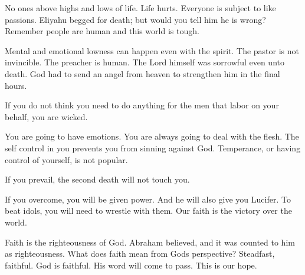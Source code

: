 \documentclass[12pt]{article}
\begin{document}
	No ones above highs and lows of life. Life 
	hurts. Everyone is subject to like passions. Eliyahu begged
	for death; but would you tell him he is wrong? Remember
	people are human and this world is tough.

	Mental and emotional lowness can happen even with the spirit. 
	The pastor is not invincible. The preacher is human. The Lord
	himself was sorrowful even unto death. God had to send an angel
	from heaven to strengthen him in the final hours.

	If you do not think you need to do anything for the men that
	labor on your behalf, you are wicked.

	\begin{quote}
		\BibleHebrewsThirteenTen{}
		\BibleHebrewsThirteenEleven{}
		\BibleHebrewsThirteenTwelve{}
		\BibleHebrewsThirteenThirteen{}
		\BibleHebrewsThirteenFourteen{}
		\BibleHebrewsThirteenFifteen{}
		\BibleHebrewsThirteenSixteen{}
		\BibleHebrewsThirteenSeventeen{}
	\end{quote}
	
	You are going to have emotions. You are always going to deal
	with the flesh. The self control in you prevents you from
	sinning against God. Temperance, or having control of yourself,
	is not popular.

	\begin{quote}
		\BibleRevelationTwoEleven{}
	\end{quote}

	If you prevail, the second death will not touch you.

	\begin{quote}
		\BibleRevelationTwoSeventeen{}
	\end{quote}

	\begin{quote}
		\BibleRevelationTwoTwentySeven{}
		\BibleRevelationTwoTwentyEight{}
	\end{quote}

	If you overcome, you will be given power. And he will also
	give you Lucifer.
	To beat idols, you will need to wrestle with them. Our faith
	is the victory over the world.

	\begin{quote}
		\BibleFirstJohnFiveFour{}
	\end{quote}

	Faith is the righteousness of God. Abraham believed, and it
	was counted to him as righteousness. What does faith mean
	from Gods perspective? Steadfast, faithful. God is faithful.
	His word will come to pass. This is our hope.
\end{document}
